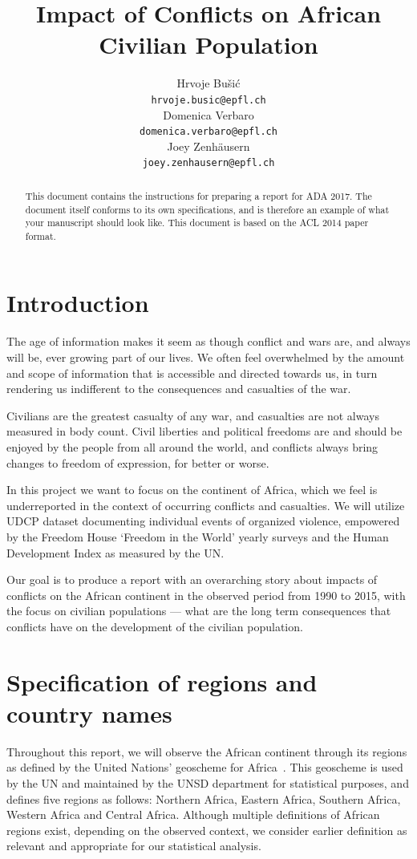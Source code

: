 \documentclass[a4paper,11pt]{article}
\title{Impact of Conflicts on African Civilian Population}
\author{Hrvoje Bušić \\
  \small{\tt hrvoje.busic@epfl.ch} \\\And
  Domenica Verbaro\\
  \small{\tt domenica.verbaro@epfl.ch} \\\And
Joey Zenhäusern\\
\small{\tt joey.zenhausern@epfl.ch} \\}
\date{}
\begin{document}
\maketitle
\begin{abstract}
  This document contains the instructions for preparing a report for ADA 2017. The document itself conforms to its own specifications, and is therefore an example of
  what your manuscript should look like. This document is based on the ACL 2014 paper format.
\end{abstract}

\section{Introduction}

The age of information makes it seem as though conflict and wars are, and always will be, ever growing part of our lives. We often feel overwhelmed by the amount and scope of information that is accessible and directed towards us, in turn rendering us indifferent to the consequences and casualties of the war.

Civilians are the greatest casualty of any war, and casualties are not always measured in body count. Civil liberties and political freedoms are and should be enjoyed by the people from all around the world, and conflicts always bring changes to freedom of expression, for better or worse.

In this project we want to focus on the continent of Africa, which we feel is underreported in the context of occurring conflicts and casualties. We will utilize UDCP dataset documenting individual events of organized violence, empowered by the Freedom House `Freedom in the World' yearly surveys and the Human Development Index as measured by the UN.

Our goal is to produce a report with an overarching story about impacts of conflicts on the African continent in the observed period from 1990 to 2015, with the focus on civilian populations --- what are the long term consequences that conflicts have on the development of the civilian population.

\section{Specification of regions and country
names}

Throughout this report, we will observe the African continent through its
regions as defined by the United Nations' geoscheme for Africa~\cite{UNGeoscheme}. This geoscheme is used by the UN and
maintained by the UNSD department for statistical purposes, and defines
five regions as follows: Northern Africa, Eastern Africa, Southern
Africa, Western Africa and Central Africa. Although multiple definitions
of African regions exist, depending on the observed context, we consider
earlier definition as relevant and appropriate for our statistical
analysis.
\end{document}
